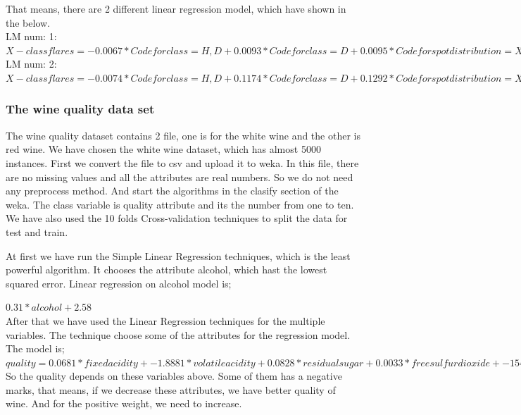 \documentclass[a4paper]{article}
\begin{document}
That means, there are 2 different linear regression model, which have shown in the below.\\
LM num: 1: \\
$X-class flares = 
	-0.0067 * Code for class=H,D 
	+ 0.0093 * Code for class=D 
	+ 0.0095 * Code for spot distribution=X,C 
	+ 0.0022 * Historically-complex 
	- 0.0031$\\
LM num: 2:\\
$X-class flares= 
	-0.0074 * Code for class=H,D 
	+ 0.1174 * Code for class=D 
	+ 0.1292 * Code for spot distribution=X,C 
	+ 0.0552 * Historically-complex 
	- 0.1607$

\subsubsection{The wine quality data set}

The wine quality dataset contains 2 file, one is for the white wine and the other is red wine. We have chosen the white wine dataset, which has almost 5000 instances. First we convert the file to csv and upload it to weka. In this file, there are no missing values and all the attributes are real numbers. So we do not need any preprocess method. And start the algorithms in the clasify section of the weka. The class variable is quality attribute and its the number from one to ten. We have also used the 10 folds Cross-validation techniques to split the data for test and train. 

At first we have run the Simple Linear Regression techniques, which is the least powerful algorithm. It chooses the attribute alcohol, which hast the lowest squared error. Linear regression on alcohol model is; 

$0.31 * alcohol + 2.58$\\

After that we have used the Linear Regression techniques for the multiple variables. The technique choose some of the attributes for the regression model. The model is;\\
$quality =
      0.0681 * fixed acidity +
     -1.8881 * volatile acidity +
      0.0828 * residual sugar +
      0.0033 * free sulfur dioxide +
   -154.2913 * density +
      0.6942 * pH +
      0.6285 * sulphates +
      0.1932 * alcohol +
    154.1062$\\

So the quality depends on these variables above. Some of them has a negative marks, that means, if we decrease these attributes, we have better quality of wine. And for the positive weight, we need to increase.
\end{document}
